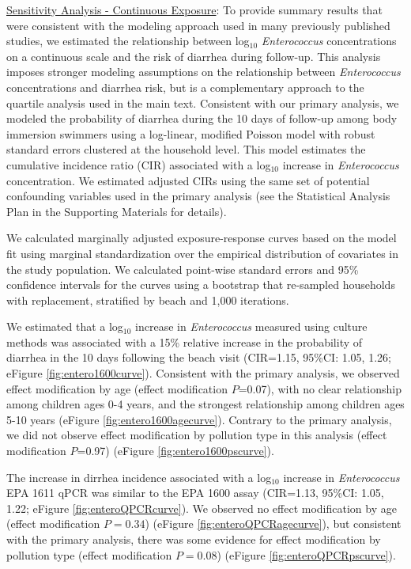 \documentclass[12pt]{article}\usepackage[]{graphicx}\usepackage[]{color}
\begin{document}
\clearpage
\underline{Sensitivity Analysis - Continuous Exposure}: To provide summary results that were consistent with the modeling approach used in many previously published studies, we estimated the relationship between log$_{10}$ \emph{Enterococcus} concentrations on a continuous scale and the risk of diarrhea during follow-up. This analysis imposes stronger modeling assumptions on the relationship between \emph{Enterococcus} concentrations and diarrhea risk, but is a complementary approach to the quartile analysis used in the main text.  Consistent with our primary analysis, we modeled the probability of diarrhea during the 10 days of follow-up among body immersion swimmers using a log-linear, modified Poisson model with robust standard errors clustered at the household level.  This model estimates the cumulative incidence ratio (CIR) associated with a log$_{10}$ increase in \emph{Enterococcus} concentration.  We estimated adjusted CIRs using the same set of potential confounding variables used in the primary analysis (see the Statistical Analysis Plan in the Supporting Materials for details). 

We calculated marginally adjusted exposure-response curves based on the model fit using marginal standardization over the empirical distribution of covariates in the study population.\supercite{Ahern2009-cv, Muller2014-xn}  We calculated point-wise standard errors and 95\% confidence intervals for the curves using a bootstrap that re-sampled households with replacement, stratified by beach and 1,000 iterations.\supercite{Ahern2009-cv}  

We estimated that a log$_{10}$ increase in \emph{Enterococcus} measured using culture methods was associated with a 15\% relative increase in the probability of diarrhea in the 10 days following the beach visit (CIR=1.15, 95\%CI: 1.05, 1.26; eFigure \ref{fig:entero1600curve}). Consistent with the primary analysis, we observed effect modification by age (effect modification $P$=0.07), with no clear relationship among children ages 0-4 years, and the strongest relationship among children ages 5-10 years (eFigure \ref{fig:entero1600agecurve}).  Contrary to the primary analysis, we did not observe effect modification by pollution type in this analysis (effect modification $P$=0.97) (eFigure \ref{fig:entero1600pscurve}).

The increase in dirrhea incidence associated with a log$_{10}$ increase in \emph{Enterococcus} EPA 1611 qPCR was similar to the EPA 1600 assay (CIR=1.13, 95\%CI: 1.05, 1.22; eFigure \ref{fig:enteroQPCRcurve}). We observed no effect modification by age (effect modification $P=0.34$) (eFigure \ref{fig:enteroQPCRagecurve}), but consistent with the primary analysis, there was some evidence for effect modification by pollution type  (effect modification $P=0.08$) (eFigure \ref{fig:enteroQPCRpscurve}).
\end{document}
